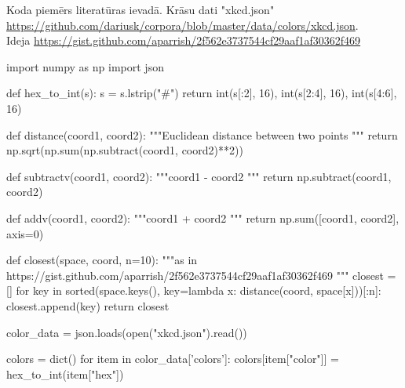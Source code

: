 Koda piemērs literatūras ievadā.
Krāsu dati "xkcd.json"
\url{https://github.com/dariusk/corpora/blob/master/data/colors/xkcd.json}.\\
Ideja \url{https://gist.github.com/aparrish/2f562e3737544cf29aaf1af30362f469}

\begin{python}
import numpy as np
import json

def hex_to_int(s):
    s = s.lstrip("#")
    return int(s[:2], 16), int(s[2:4], 16), int(s[4:6], 16)


def distance(coord1, coord2):
	"""Euclidean distance between two points
	"""
	return np.sqrt(np.sum(np.subtract(coord1, coord2)**2))


def subtractv(coord1, coord2):
	"""coord1 - coord2
	"""
	return np.subtract(coord1, coord2)


def addv(coord1, coord2):
	"""coord1 + coord2
	"""
	return np.sum([coord1, coord2], axis=0)


def closest(space, coord, n=10):
	"""as in https://gist.github.com/aparrish/2f562e3737544cf29aaf1af30362f469
	"""
	closest = []
	for key in sorted(space.keys(),
						key=lambda x: distance(coord, space[x]))[:n]:
		closest.append(key)
	return closest


color_data = json.loads(open("xkcd.json").read())

colors = dict()
for item in color_data['colors']:
    colors[item["color"]] = hex_to_int(item["hex"])

\end{python}
